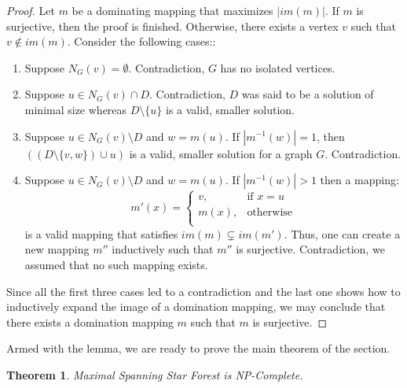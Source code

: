 \documentclass[en]{pracamgr}
\newtheorem{theorem}{Theorem}
\newcommand{\mssfp}{{\sc Maximal Spanning Star Forest}}
\begin{document}
\begin{proof}
	Let $m$ be a dominating mapping that maximizes $|im(m)|$. If $m$ is surjective, then the proof is finished. Otherwise, there exists a vertex $v$ such that $v \notin im(m)$. Consider the following cases::
	\begin{enumerate}
		\item Suppose $N_G(v) = \emptyset$. Contradiction, $G$ has no isolated vertices.
		\item Suppose $u \in N_G(v) \cap D$. Contradiction, $D$ was said to be a solution of minimal size whereas $D \setminus \{u\}$ is a valid, smaller solution.
		\item Suppose $u \in N_{G}(v) \setminus D$ and $w = m(u)$. If $|m^{-1}(w)|=1$, then $((D \setminus \{v,w\}) \cup u)$ is a valid, smaller solution for a graph $G$. Contradiction.
		\item Suppose $u \in N_{G}(v) \setminus D$ and $w = m(u)$. If $|m^{-1}(w)| > 1$ then a mapping:
		\begin{equation*}
			m'(x) = \begin{cases}
			v, & \text{if }x = u \\
			m(x), &\text{otherwise} \\
			\end{cases}
		\end{equation*}
		is a valid mapping that satisfies $im(m) \subsetneq im(m')$. Thus, one can create a new mapping $m''$ inductively such that $m''$ is surjective. Contradiction, we assumed that no such mapping exists. 
	\end{enumerate}
	
	Since all the first three cases led to a contradiction and the last one shows how to inductively expand the image of a domination mapping, we may conclude that there exists a domination mapping $m$ such that $m$ is surjective.  
\end{proof}

Armed with the lemma, we are ready to prove the main theorem of the section.

\begin{theorem}\label{dom ssf}
	\mssfp{} is NP-Complete.
\end{theorem}
\end{document}
